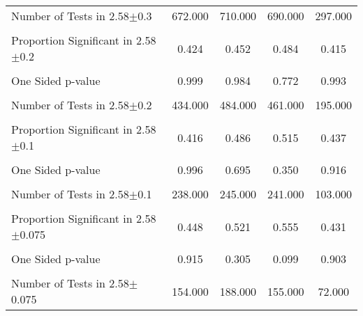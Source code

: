 {\begin{tabular}{l*{4}{c}}
Number of Tests in 2.58$\pm$0.3&  672.000         &  710.000         &  690.000         &  297.000         \\
                &                  &                  &                  &                  \\
\hline Proportion Significant in 2.58$\pm$0.2&    0.424         &    0.452         &    0.484         &    0.415         \\
                &                  &                  &                  &                  \\
One Sided p-value&    0.999         &    0.984         &    0.772         &    0.993         \\
                &                  &                  &                  &                  \\
Number of Tests in 2.58$\pm$0.2&  434.000         &  484.000         &  461.000         &  195.000         \\
                &                  &                  &                  &                  \\
\hline Proportion Significant in 2.58$\pm$0.1&    0.416         &    0.486         &    0.515         &    0.437         \\
                &                  &                  &                  &                  \\
One Sided p-value&    0.996         &    0.695         &    0.350         &    0.916         \\
                &                  &                  &                  &                  \\
Number of Tests in 2.58$\pm$0.1&  238.000         &  245.000         &  241.000         &  103.000         \\
                &                  &                  &                  &                  \\
\hline Proportion Significant in 2.58$\pm$0.075&    0.448         &    0.521         &    0.555         &    0.431         \\
                &                  &                  &                  &                  \\
One Sided p-value&    0.915         &    0.305         &    0.099         &    0.903         \\
                &                  &                  &                  &                  \\
Number of Tests in 2.58$\pm$0.075&  154.000         &  188.000         &  155.000         &   72.000         \\

\end{tabular}}
